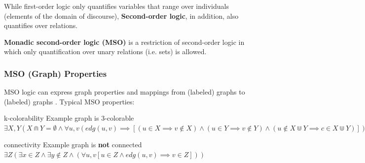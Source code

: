 \documentclass[a4paper, 12pt, bibliography=totoc]{scrartcl}
\begin{document}
While first-order logic only quantifies variables that range over individuals (elements of the domain of discourse),
\textbf{Second-order logic}, in addition, also quantifies over relations.

\textbf{Monadic second-order logic (MSO)} is a restriction of second-order logic in which only quantification over unary relations (i.e. sets) is allowed. 


%


\subsubsection{MSO (Graph) Properties}
MSO logic can express graph properties and mappings from (labeled) graphs to (labeled) graphs \cite{CourcelleGROW}.
Typical MSO properties:

k-colorability
Example graph is 3-colorable
$\exists X,Y (X \Cap Y = \emptyset \land \forall u,v (edg(u,v) \implies [(u\in X \implies v\notin X)\land (u\in Y \implies v\notin Y)\land (u\notin X \Cup Y \implies c \in X \Cup Y)]))$

connectivity
Example graph is \textbf{not} connected
$\exists Z(\exists x \in Z \land \exists y \notin Z \land (\forall u,v [u\in Z \land edg(u,v) \implies v \in Z]))$
\end{document}
